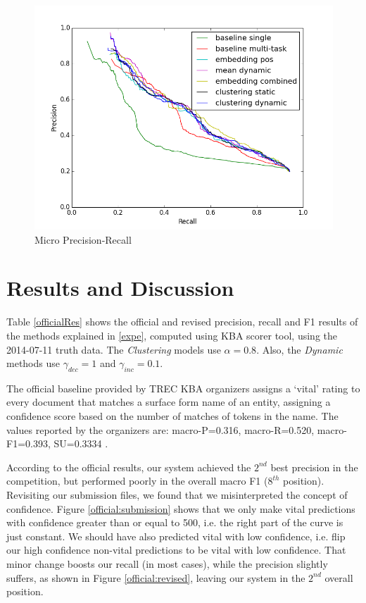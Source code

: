 \documentclass{article}
\begin{document}
\begin{figure}[tb]
\centering
\includegraphics[width=.5\textwidth]{fig/microPrecisionRecall.png}
\caption{Micro Precision-Recall}
\label{microPrecRecall}
\end{figure}

\section{Results and Discussion}

Table \ref{officialRes} shows the official and revised precision, recall and F1 results of the methods explained in \ref{expe}, computed using KBA scorer tool, using the 2014-07-11 truth data. The \textit{Clustering} models use $\alpha=0.8$. Also, the \textit{Dynamic} methods use $\gamma_{dec}=1$ and $\gamma_{inc}=0.1$.

The official baseline provided by TREC KBA organizers assigns a `vital' rating to every document that matches a surface form name of an entity, assigning a confidence score based on the number of matches of tokens in the name. The values reported by the organizers are: macro-P=0.316, macro-R=0.520, macro-F1=0.393, SU=0.3334 \cite{frank14:overview}.

According to the official results, our system achieved the $2^{nd}$ best precision in the competition, but performed poorly in the overall macro F1 ($8^{th}$ position). Revisiting our submission files, we found that we misinterpreted the concept of confidence. Figure \ref{official:submission} shows that we only make vital predictions with confidence greater than or equal to 500, i.e. the right part of the curve is just constant. We should have also predicted vital with low confidence, i.e. flip our high confidence non-vital predictions to be vital with low confidence. That minor change boosts our recall (in most cases), while the precision slightly suffers, as shown in Figure \ref{official:revised}, leaving our system in the $2^{nd}$ overall position.
\end{document}
